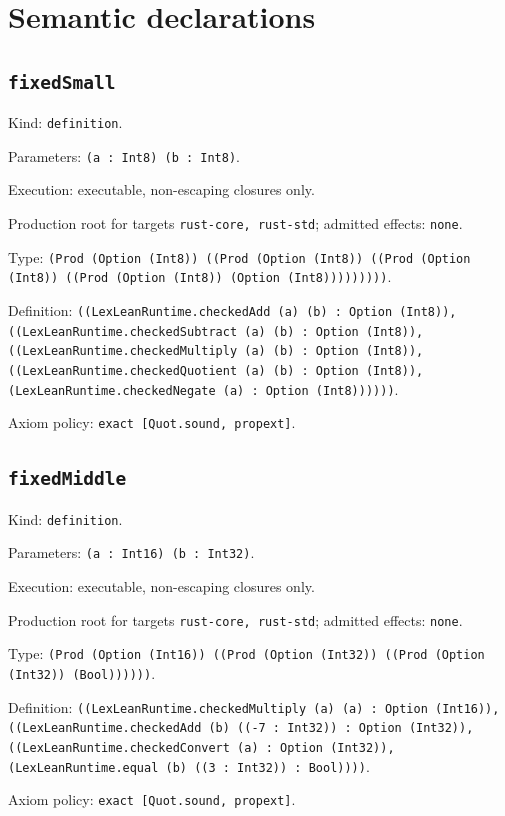 \documentclass[11pt]{article}
\begin{document}
\section*{Semantic declarations}
\subsection*{\texttt{fixedSmall}}
\noindent Kind: \texttt{definition}.\par
\noindent Parameters: \texttt{(a : Int8) (b : Int8)}.\par
\noindent Execution: executable, non-escaping closures only.\par
\noindent Production root for targets \texttt{rust-core, rust-std}; admitted effects: \texttt{none}.\par
\noindent Type: \texttt{(Prod (Option (Int8)) ((Prod (Option (Int8)) ((Prod (Option (Int8)) ((Prod (Option (Int8)) (Option (Int8)))))))))}.\par
\noindent Definition: \texttt{((LexLeanRuntime.checkedAdd (a) (b) : Option (Int8)), ((LexLeanRuntime.checkedSubtract (a) (b) : Option (Int8)), ((LexLeanRuntime.checkedMultiply (a) (b) : Option (Int8)), ((LexLeanRuntime.checkedQuotient (a) (b) : Option (Int8)), (LexLeanRuntime.checkedNegate (a) : Option (Int8))))))}.\par
\noindent Axiom policy: \texttt{exact [Quot.sound, propext]}.\par
\subsection*{\texttt{fixedMiddle}}
\noindent Kind: \texttt{definition}.\par
\noindent Parameters: \texttt{(a : Int16) (b : Int32)}.\par
\noindent Execution: executable, non-escaping closures only.\par
\noindent Production root for targets \texttt{rust-core, rust-std}; admitted effects: \texttt{none}.\par
\noindent Type: \texttt{(Prod (Option (Int16)) ((Prod (Option (Int32)) ((Prod (Option (Int32)) (Bool))))))}.\par
\noindent Definition: \texttt{((LexLeanRuntime.checkedMultiply (a) (a) : Option (Int16)), ((LexLeanRuntime.checkedAdd (b) ((-7 : Int32)) : Option (Int32)), ((LexLeanRuntime.checkedConvert (a) : Option (Int32)), (LexLeanRuntime.equal (b) ((3 : Int32)) : Bool))))}.\par
\noindent Axiom policy: \texttt{exact [Quot.sound, propext]}.\par
\end{document}
